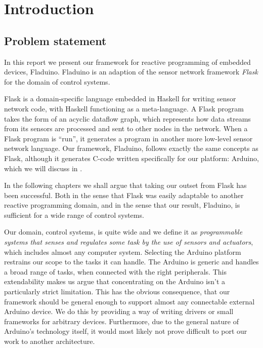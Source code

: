 \documentclass[a4paper, oneside, final]{memoir}
\let\fref\undefined
\begin{document}





\mainmatter

\chapter{Introduction}

\section{Problem statement}
In this report we present our framework for reactive programming of
embedded devices, Fladuino. Fladuino is an adaption of the
sensor network framework \textit{Flask} for the domain of control
systems.

Flask is a domain-specific language embedded in Haskell for writing
sensor network code, with Haskell functioning as a meta-language. A
Flask program takes the form of an acyclic dataflow graph, which
represents how data streams from its sensors are processed and sent to
other nodes in the network. When a Flask program is ``run'', it
generates a program in another more low-level sensor network
language. Our framework, Fladuino, follows exactly the same concepts
as Flask, although it generates C-code written specifically for our
platform: Arduino, which we will discuss in \fref[plain]{sec:hardware platform}.

In the following chapters we shall argue that taking our outset from
Flask has been successful. Both in the sense that Flask was easily
adaptable to another reactive programming domain, and in the sense
that our result, Fladuino, is sufficient for a wide range of control
systems.

Our domain, control systems, is quite wide and we define it as
\textit{programmable systems that senses and regulates some task by
  the use of sensors and actuators}, which includes almost any
computer system.  Selecting the Arduino platform restrains our scope
to the tasks it can handle. The Arduino is generic and handles a broad
range of tasks, when connected with the right peripherals. This
extendability makes us argue that concentrating on the Arduino isn't a
particularly strict limitation. This has the obvious consequence, that our
framework should be general enough to support almost any connectable
external Arduino device. We do this by providing a way of writing
drivers or small frameworks for arbitrary devices.  Furthermore, due
to the general nature of Arduino's technology itself, it would most likely
not prove difficult to port our work to another architecture.
\end{document}
